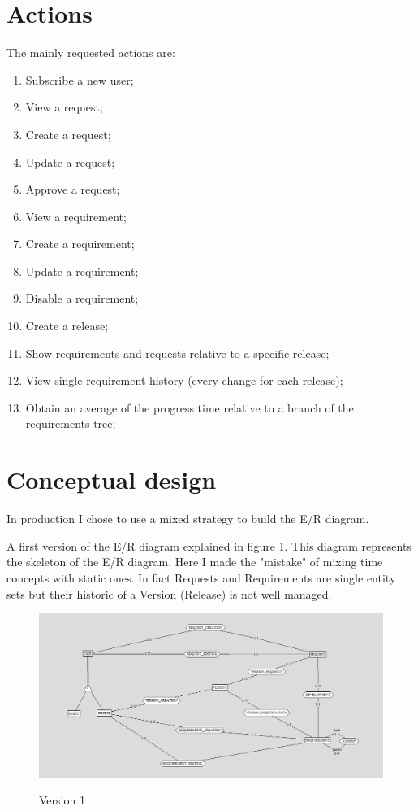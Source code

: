 \documentclass[12pt, a4paper]{report}
\begin{document}
\section*{Actions}

The mainly requested actions are:
\begin{enumerate}
    \item Subscribe a new user;
    \item View a request;
    \item Create a request;
    \item Update a request;
    \item Approve a request;
    \item View a requirement;
    \item Create a requirement;
    \item Update a requirement;
    \item Disable a requirement;
    \item Create a release;
    \item Show requirements and requests relative to a specific release;
    \item View single requirement history (every change for each release);
    \item Obtain an average of the progress time relative to a branch of the requirements tree;
\end{enumerate}

\section*{Conceptual design}

In production I chose to use a mixed strategy to build the E/R diagram.

A first version of the E/R diagram explained in figure \ref{fig:ER_v1}.
This diagram represents the skeleton of the E/R diagram.
Here I made the "mistake" of mixing time concepts with static ones.
In fact Requests and Requirements are single entity sets but their historic of a Version (Release) is not well managed.

\begin{figure}[H]
\centering
\caption{Version 1}
\includegraphics[width=\textwidth]{E-R conceptual v1}
\label{fig:ER_v1}
\end{figure}
\end{document}
